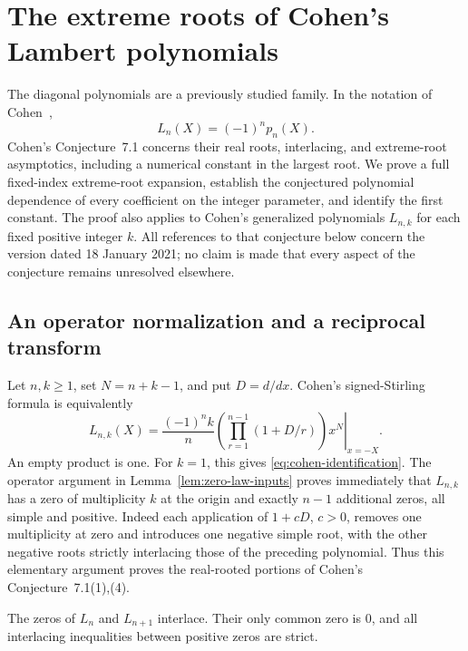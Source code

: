\section{The extreme roots of Cohen's Lambert polynomials}
\label{sec:cohen-edges}

The diagonal polynomials are a previously studied family.  In the
notation of Cohen~\cite[Proposition~4.8]{Cohen2021},
\begin{equation}\label{eq:cohen-identification}
 L_n(X)=(-1)^n p_n(X).
\end{equation}
Cohen's Conjecture~7.1 concerns their real roots, interlacing, and
extreme-root asymptotics, including a numerical constant in the largest
root.  We prove a full fixed-index extreme-root expansion, establish
the conjectured polynomial dependence of every coefficient on the
integer parameter, and identify the first constant.  The proof
also applies to Cohen's generalized polynomials
$L_{n,k}$ for each fixed positive integer $k$.  All references to that
conjecture below concern the version dated 18 January 2021; no claim is
made that every aspect of the conjecture remains unresolved elsewhere.

\subsection{An operator normalization and a reciprocal transform}

Let $n,k\geq1$, set $N=n+k-1$, and put $D=d/dx$.  Cohen's signed-Stirling
formula is equivalently
\begin{equation}\label{eq:cohen-operator}
 L_{n,k}(X)=\frac{(-1)^n k}{n}
   \left.\left(\prod_{r=1}^{n-1}(1+D/r)\right)x^N\right|_{x=-X}.
\end{equation}
An empty product is one.  For $k=1$, this gives
\eqref{eq:cohen-identification}.  The operator argument in
Lemma~\ref{lem:zero-law-inputs} proves immediately that $L_{n,k}$ has
a zero of multiplicity $k$ at the origin and exactly $n-1$ additional
zeros, all simple and positive.  Indeed each application of $1+cD$,
$c>0$, removes one multiplicity at zero and introduces one negative
simple root, with the other negative roots strictly interlacing those
of the preceding polynomial.  Thus this elementary argument proves
the real-rooted portions of Cohen's Conjecture~7.1(1),(4).

\begin{proposition}
\label{prop:cohen-interlacing}
The zeros of $L_n$ and $L_{n+1}$ interlace.  Their only common zero
is $0$, and all interlacing inequalities between positive zeros are
strict.
\end{proposition}

